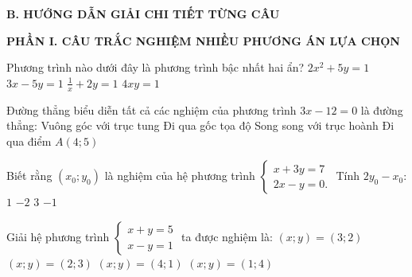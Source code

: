 \documentclass[12pt,a4paper]{article}
\begin{document}
\noindent\textbf{\large B. HƯỚNG DẪN GIẢI CHI TIẾT TỪNG CÂU}
\vspace{1mm}

\noindent\textbf{\large PHẦN I. CÂU TRẮC NGHIỆM NHIỀU PHƯƠNG ÁN LỰA CHỌN}
\vspace{1mm}
\begin{ex}
Phương trình nào dưới đây là phương trình bậc nhất hai ẩn?
\choice
{$2x^2 + 5y = 1$}
{\True $3x - 5y = 1$}
{$\frac{1}{x} + 2y = 1$}
{$4xy = 1$}
\end{ex}

\begin{ex}
Đường thẳng biểu diễn tất cả các nghiệm của phương trình $3x - 12 = 0$ là đường thẳng:
\choice
{Vuông góc với trục tung}
{Đi qua gốc tọa độ}
{Song song với trục hoành}
{\True Đi qua điểm $A(4; 5)$}
\end{ex}

\begin{ex}
Biết rằng $(x_0; y_0)$ là nghiệm của hệ phương trình $\begin{cases} x + 3y = 7 \\ 2x - y = 0. \end{cases}$ Tính $2y_0 - x_0$:
\choice
{$1$}
{$-2$}
{\True $3$}
{$-1$}
\end{ex}

\begin{ex}
Giải hệ phương trình $\begin{cases} x + y = 5 \\ x - y = 1 \end{cases}$ ta được nghiệm là:
\choice
{\True $(x; y) = (3; 2)$}
{$(x; y) = (2; 3)$}
{$(x; y) = (4; 1)$}
{$(x; y) = (1; 4)$}
\end{ex}
\end{document}

